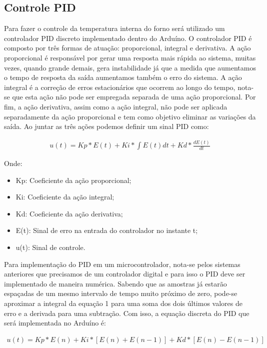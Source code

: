 \subsection{Controle PID}
Para fazer o controle da temperatura interna do forno será utilizado um controlador PID discreto implementado dentro do Arduíno. O controlador PID é composto por três formas de atuação: proporcional, integral e derivativa. A ação proporcional é responsável por gerar uma resposta mais rápida ao sistema, muitas vezes, quando grande demais, gera instabilidade já que a medida que aumentamos o tempo de resposta da saída aumentamos também o erro do sistema. A ação integral é a correção de erros estacionários que ocorrem ao longo do tempo, nota-se que esta ação não pode ser empregada separada de uma ação proporcional. Por fim, a ação derivativa, assim como a ação integral, não pode ser aplicada separadamente da ação proporcional e tem como objetivo eliminar as variações da saída. Ao juntar as três ações podemos definir um sinal PID como:

\begin{gather}
    u(t) = Kp * E(t) + Ki * \int E(t)dt + Kd * \frac{dE(t)}{dt}
\end{gather}

Onde:

\begin{itemize}
	\item Kp: Coeficiente da ação proporcional;
	\item Ki: Coeficiente da ação integral;
	\item Kd: Coeficiente da ação derivativa;
	\item E(t): Sinal de erro na entrada do controlador no instante t;
	\item u(t): Sinal de controle.
\end{itemize}

Para implementação do PID em um microcontrolador, nota-se pelos sistemas anteriores que precisamos de um controlador digital e para isso o PID deve ser implementado de maneira numérica. Sabendo que as amostras já estarão espaçadas de um mesmo intervalo de tempo muito próximo de zero, pode-se aproximar a integral da equação 1 para uma soma dos dois últimos valores de erro e a derivada para uma subtração. Com isso, a equação discreta do PID que será implementada no Arduíno é:

\begin{gather}
    u(t) = Kp * E(n) + Ki * [E(n) + E(n - 1)] + Kd * [E(n) - E(n - 1)]
\end{gather}

